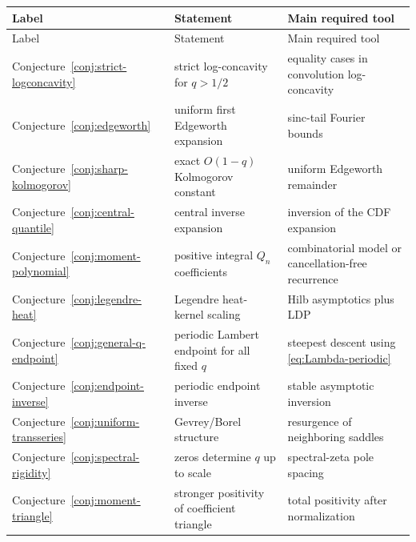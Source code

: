 \documentclass[11pt]{article}
\theoremstyle{definition}
\theoremstyle{remark}
\begin{document}
{\small
\begin{longtable}{>{\raggedright\arraybackslash}p{}>{\raggedright\arraybackslash}p{}>{\raggedright\arraybackslash}p{}}
\toprule
Label & Statement & Main required tool\\
\midrule
\endfirsthead
\toprule
Label & Statement & Main required tool\\
\midrule
\endhead
Conjecture~\ref{conj:strict-logconcavity} & strict log-concavity for $q>1/2$ & equality cases in convolution log-concavity\\
Conjecture~\ref{conj:edgeworth} & uniform first Edgeworth expansion & sinc-tail Fourier bounds\\
Conjecture~\ref{conj:sharp-kolmogorov} & exact $O(1-q)$ Kolmogorov constant & uniform Edgeworth remainder\\
Conjecture~\ref{conj:central-quantile} & central inverse expansion & inversion of the CDF expansion\\
Conjecture~\ref{conj:moment-polynomial} & positive integral $Q_n$ coefficients & combinatorial model or cancellation-free recurrence\\
Conjecture~\ref{conj:legendre-heat} & Legendre heat-kernel scaling & Hilb asymptotics plus LDP\\
Conjecture~\ref{conj:general-q-endpoint} & periodic Lambert endpoint for all fixed $q$ & steepest descent using \cref{eq:Lambda-periodic}\\
Conjecture~\ref{conj:endpoint-inverse} & periodic endpoint inverse & stable asymptotic inversion\\
Conjecture~\ref{conj:uniform-transseries} & Gevrey/Borel structure & resurgence of neighboring saddles\\
Conjecture~\ref{conj:spectral-rigidity} & zeros determine $q$ up to scale & spectral-zeta pole spacing\\
Conjecture~\ref{conj:moment-triangle} & stronger positivity of coefficient triangle & total positivity after normalization\\
\bottomrule
\end{longtable}
}
\end{document}
